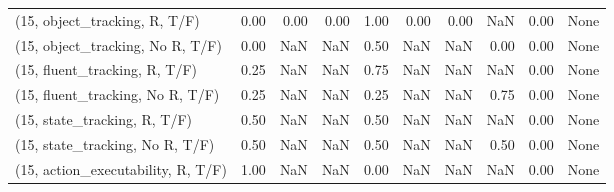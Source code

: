 \begin{table*}[h!]
\begin{adjustbox}{width=2\columnwidth,center}
\begin{tabular}{lrrr|rrr|rrr}
\midrule
(15, object\_tracking, R, T/F)         &                      0.00 &                  0.00 &                      0.00 &                          1.00 &                      0.00 &                          0.00 &                                    NaN &                               0.00 &                                  None \\
(15, object\_tracking, No R, T/F)      &                      0.00 &                   NaN &                       NaN &                          0.50 &                       NaN &                           NaN &                                   0.00 &                               0.00 &                                  None \\
(15, fluent\_tracking, R, T/F)         &                      0.25 &                   NaN &                       NaN &                          0.75 &                       NaN &                           NaN &                                    NaN &                               0.00 &                                  None \\
(15, fluent\_tracking, No R, T/F)      &                      0.25 &                   NaN &                       NaN &                          0.25 &                       NaN &                           NaN &                                   0.75 &                               0.00 &                                  None \\
(15, state\_tracking, R, T/F)          &                      0.50 &                   NaN &                       NaN &                          0.50 &                       NaN &                           NaN &                                    NaN &                               0.00 &                                  None \\
(15, state\_tracking, No R, T/F)       &                      0.50 &                   NaN &                       NaN &                          0.50 &                       NaN &                           NaN &                                   0.50 &                               0.00 &                                  None \\
(15, action\_executability, R, T/F)    &                      1.00 &                   NaN &                       NaN &                          0.00 &                       NaN &                           NaN &                                    NaN &                               0.00 &                                  None \\

\end{tabular}
\end{adjustbox}
\end{table*}
